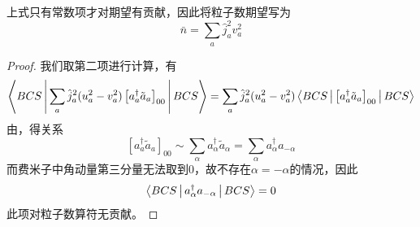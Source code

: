 上式只有常数项才对期望有贡献，因此将粒子数期望写为
\begin{equation}
    \bar{n} = \sum_{a} \hat{j}^2_{a} v_{a}^2
    \label{eq:bcs-part-oper}
\end{equation}

\begin{proof}
    我们取第二项进行计算，有
    \begin{equation*}
        \Braket{BCS|\sum_{a}\hat{j}^2_{a} (u_{a}^2 - v_{a}^2) \left[a_{a}^{\dagger} \tilde{a}_a\right]_{00}|BCS} = \sum_{a}\hat{j}^2_{a} (u_{a}^2 - v_{a}^2) \Braket{BCS| \left[a_{a}^{\dagger} \tilde{a}_a\right]_{00} |BCS}
    \end{equation*}
    由\citep[Eq. 2.51]{suhonen-NtoN}，得关系
    \begin{equation*}
        \left[a_{a}^{\dagger} \tilde{a}_a\right]_{00} \sim \sum_{\alpha} a_{\alpha}^{\dagger} \tilde{a}_{\alpha} = \sum_{\alpha} a_{\alpha}^{\dagger} a_{-\alpha}
    \end{equation*}
    而费米子中角动量第三分量无法取到0，故不存在$\alpha = -\alpha$的情况，因此
    \begin{equation*}
        \Braket{BCS | a_{\alpha}^{\dagger} a_{-\alpha} | BCS} = 0
    \end{equation*}
    此项对粒子数算符无贡献。
\end{proof}






